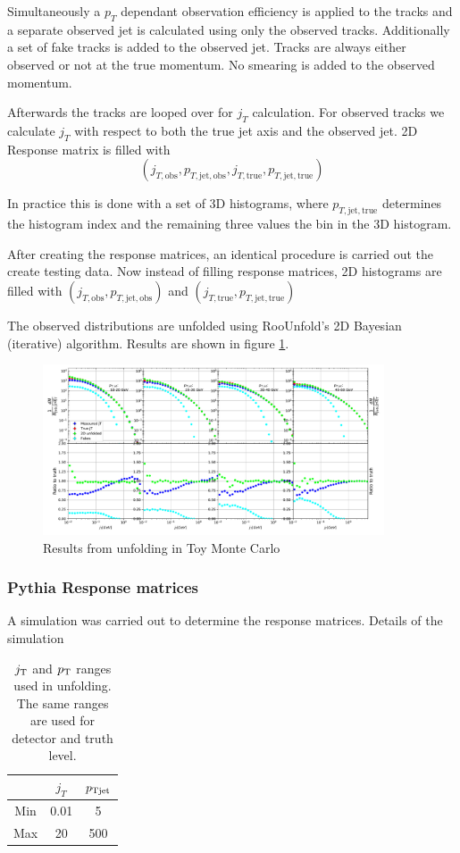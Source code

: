 Simultaneously a $p_T$ dependant observation efficiency is applied to the tracks and a separate observed jet is calculated using only the observed tracks. Additionally a set of fake tracks is added to the observed jet. Tracks are always either observed or not at the true momentum. No smearing is added to the observed momentum.

Afterwards the tracks are looped over for $j_T$ calculation. For observed tracks we calculate $j_T$ with respect to both the true jet axis and the observed jet. 2D Response matrix is filled with $$\left(j_{T,\mathrm{obs}},p_{T,\mathrm{jet,obs}}, j_{T,\mathrm{true}},p_{T,\mathrm{jet,true}}\right)$$

In practice this is done with a set of 3D histograms, where $p_{T,\mathrm{jet,true}}$ determines the histogram index and the remaining three values the bin in the 3D histogram.

After creating the response matrices, an identical procedure is carried out the create testing data. Now instead of filling response matrices, 2D histograms are filled with $\left(j_{T,\mathrm{obs}},p_{T,\mathrm{jet,obs}}\right)$ and $\left(j_{T,\mathrm{true}},p_{T,\mathrm{jet,true}}\right)$

The observed distributions are unfolded using RooUnfold's 2D Bayesian (iterative) algorithm. Results are shown in figure \ref{fig:toymc}.

\begin{figure}
\centering
\includegraphics[width=0.9\textwidth]{figures/analysis/ToyMCUnfolder_300k_events.pdf}
\caption{Results from unfolding in Toy Monte Carlo}
\label{fig:toymc}
\end{figure}

\subsubsection{Pythia Response matrices}
A  simulation was carried out to determine the response matrices. 
{\color{red} Details of the simulation}
\begin{table}
\centering
\caption{$j_{\rm T}$ and $p_{\rm T}$ ranges used in unfolding. The same ranges are used for detector and truth level.}
\label{tab:unfranges}
\begin{tabular}{c | c | c}
 & $j_T$ & $p_{\rm Tjet}$ \\
 \hline
Min & 0.01 & 5 \\
Max & 20 & 500 \\
\hline
\end{tabular}
\end{table}

